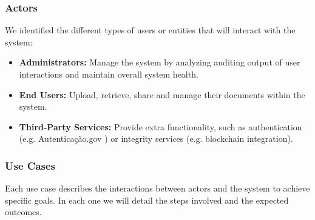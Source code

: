 \documentclass[a4paper,11pt]{article}
\begin{document}
            \subsubsection{Actors}
            We identified the different types of users or entities that will interact with the system:
                \begin{itemize}
                    \item \textbf{Administrators:} Manage the system by analyzing auditing output of user interactions and maintain overall system health.
                    
                    \item \textbf{End Users:} Upload, retrieve, share and manage their documents within the system.
                    
                    \item \textbf{Third-Party Services:} Provide extra functionality, such as authentication (e.g. Autenticação.gov \cite{AutenticacaoGov}) or integrity services (e.g. blockchain integration).
                \end{itemize}
            
        
            \subsubsection{Use Cases}
            \quad Each use case describes the interactions between actors and the system to achieve specific goals. In each one we will detail the steps involved and the expected outcomes.
            
\end{document}
